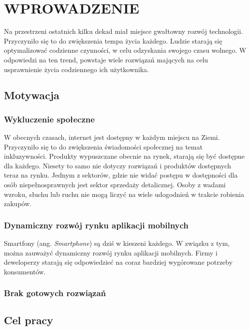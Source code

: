 \chapter{WPROWADZENIE}
\label{chapter:wprowadzenie}

Na przestrzeni ostatnich kilku dekad miał miejsce gwałtowny rozwój technologii. Przyczyniło się to do zwiększenia tempa życia każdego. Ludzie starają się optymalizować codzienne czynności, w celu odzyskania swojego czasu wolnego. W odpowiedzi na ten trend, powstaje wiele rozwiązań mających na celu usprawnienie życia codziennego ich użytkownika. 

\section{Motywacja}

\subsection{Wykluczenie społeczne}

W obecnych czasach, internet jest dostępny w każdym miejscu na Ziemi. Przyczyniło się to do zwiększenia świadomości społecznej na temat inkluzywności. Produkty wypuszczane obecnie na rynek, starają się być dostępne dla każdego. Niesety to samo nie dotyczy rozwiązań i produktów dostępnych teraz na rynku. Jednym z sektorów, gdzie nie widać postępu w dostępności dla osób niepełnosprawnych jest sektor sprzedaży detalicznej. Osoby z wadami wzroku, słuchu lub ruchu nie mogą liczyć na wiele udogodnień w trakcie robienia zakupów.

\subsection{Dynamiczny rozwój rynku aplikacji mobilnych}

Smartfony (ang. \textit{Smartphone}) są dziś w kieszeni każdego. W związku z tym, można zauważyć dynamiczny rozwój rynku aplikacji mobilnych. Firmy i deweloperzy starają się odpowiedzieć na coraz bardziej wygórowane potrzeby konsumentów.

\subsection{Brak gotowych rozwiązań}

\section{Cel pracy}

